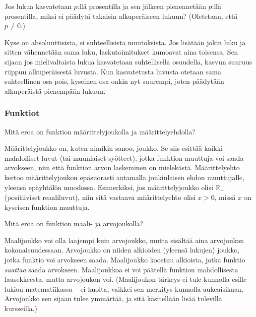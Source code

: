 \begin{tehtava}
Jos lukua kasvatetaan $p$:llä prosentilla ja sen jälkeen pienennetään $p$:llä prosentilla, miksi ei päädytä takaisin alkuperäiseen lukuun? (Oletetaan, että $p\neq 0$.)
	\begin{vastaus}
	Kyse on absoluuttisista, ei suhteellisista muutoksista. Jos lisätään jokin luku ja sitten vähennetään sama luku, laskutoimitukset kumoavat aina toisensa. Sen sijaan jos mielivaltaista lukua kasvatetaan suhtellisella osuudella, kasvun suuruus riippuu alkuperäisestä luvusta. Kun kasvatetusta luvusta otetaan sama suhteellinen osa pois, kyseinen osa onkin nyt suurempi, joten päädytään alkuperäistä pienempään lukuun.
	\end{vastaus}
\end{tehtava}

\subsubsection*{Funktiot}

\begin{tehtava}
Mitä eroa on funktion määrittelyjoukolla ja määrittelyehdolla?
\begin{vastaus}
Määrittelyjoukko on, kuten nimikin sanoo, joukko. Se siis esittää kaikki mahdolliset luvut (tai muunlaiset syötteet), jotka funktion muuttuja voi saada arvokseen, niin että funktion arvon laskeminen on mielekästä. Määrittelyehto kertoo määrittelyjoukon epäsuorasti antamalla jonkinlaisen ehdon muuttujalle, yleensä epäyhtälön muodossa. Esimerkiksi, jos määrittelyjoukko olisi $\mathbb{R}_+$ (positiiviset reaaliluvut), niin sitä vastaava määrittelyehto olisi $x>0$, missä $x$ on kyseisen funktion muuttuja.
\end{vastaus}
\end{tehtava}

\begin{tehtava}
Mitä eroa on funktion maali- ja arvojoukolla?
	\begin{vastaus}
Maalijoukko voi olla laajempi kuin arvojoukko, mutta sisältää aina arvojoukon kokonaisuudessaan. Arvojoukko on niiden alkioiden (yleensä lukujen) joukko, jotka funktio voi arvokseen saada. Maalijoukko koostuu alkioista, jotka funktio \textit{saattaa} saada arvokseen. Maalijoukkoa ei voi päätellä funktion mahdollisesta lausekkeesta, mutta arvojoukon voi. (Maalijoukon tärkeys ei tule kunnolla esille lukion matematiikassa -- ei huolta, vaikkei sen merkitys kunnolla aukeaisikaan. Arvojoukko sen sijaan tulee ymmärtää, ja sitä käsitellään lisää tulevilla kursseilla.)
	\end{vastaus}
\end{tehtava}


